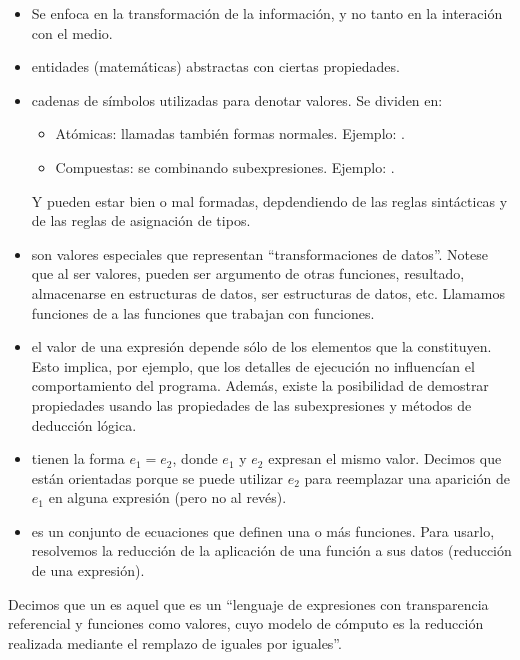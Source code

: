\begin{itemize}
  \item Se enfoca en la transformación de la información, y no tanto en la interación con el medio.
  \item {} entidades (matemáticas) abstractas con ciertas propiedades.
  \item {} cadenas de símbolos utilizadas para denotar valores. Se dividen en:
    \begin{itemize}
      \item Atómicas: llamadas también formas normales. Ejemplo: .
      \item Compuestas: se  combinando subexpresiones. Ejemplo: .
    \end{itemize}
    Y pueden estar bien o mal formadas, depdendiendo de las reglas sintácticas y de las reglas de asignación de tipos.
  \item {} son valores especiales que representan ``transformaciones de datos''. Notese que al ser valores, pueden ser argumento de otras funciones, resultado, almacenarse en estructuras de datos, ser estructuras de datos, etc. Llamamos funciones de  a las funciones que trabajan con funciones.
  \item {} el valor de una expresión depende sólo de los elementos que la constituyen. Esto implica, por ejemplo, que los detalles de ejecución no influencían el comportamiento del programa. Además, existe la posibilidad de demostrar propiedades usando las propiedades de las subexpresiones y métodos de deducción lógica.
  \item {} tienen la forma $e_1 = e_2$, donde $e_1$ y $e_2$ expresan el mismo valor. Decimos que están orientadas porque se puede utilizar $e_2$ para reemplazar una aparición de $e_1$ en alguna expresión (pero no al revés).
  \item {} es un conjunto de ecuaciones que definen una o más funciones. Para usarlo, resolvemos la reducción de la aplicación de una función a sus datos (reducción de una expresión).
\end{itemize}

Decimos que un  es aquel que es un ``lenguaje de expresiones con transparencia referencial y funciones como valores, cuyo modelo de cómputo es la reducción realizada mediante el remplazo de iguales por iguales''.

